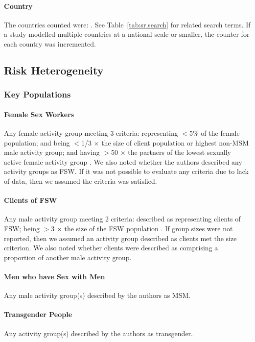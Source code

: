 \paragraph{Country}
The countries counted were: \emph{\srcountries}.
See Table~\ref{tab:sr.search} for related search terms.
If a study modelled multiple countries at a national scale or smaller,
the counter for each country was incremented.
\subsection{Risk Heterogeneity}\label{app.sr.defs.risk}
\subsubsection{Key Populations}\label{app.sr.defs.kp}
\paragraph{Female Sex Workers}
Any female activity group meeting 3 criteria:
representing {$<$5\%} of the female population; and
being {$<$1/3 $\times$} the size of client population or highest non-MSM male activity group; and
having {$>$50 $\times$} the partners of the lowest sexually active female activity group
\cite{Vandepitte2006,Carael2006,Scorgie2012}.
We also noted whether the authors described any activity groups as FSW.
If it was not possible to evaluate any criteria due to lack of data,
then we assumed the criteria was satisfied.
\paragraph{Clients of FSW}
Any male activity group meeting 2 criteria:
described as representing clients of FSW;
being {$>$3 $\times$} the size of the FSW population \cite{Carael2006}.
If group sizes were not reported,
then we assumed an activity group described as clients met the size criterion.
We also noted whether clients were described as
comprising a proportion of another male activity group.
\paragraph{Men who have Sex with Men}
Any male activity group(s) described by the authors as MSM.
\paragraph{Transgender People}
Any activity group(s) described by the authors as transgender.
